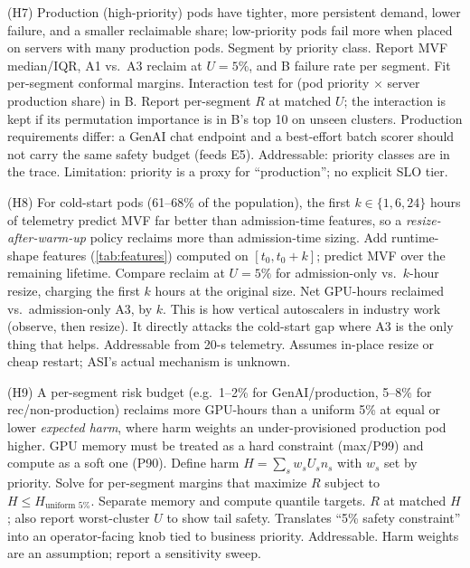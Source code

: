 {(H7) Production (high-priority) pods have tighter, more persistent demand, lower failure, and a smaller reclaimable share; low-priority pods fail more when placed on servers with many production pods.}
{Segment by priority class. Report MVF median/IQR, A1 vs.\ A3 reclaim at $U=5\%$, and B failure rate per segment. Fit per-segment conformal margins. Interaction test for (pod priority $\times$ server production share) in B.}
{Report per-segment $R$ at matched $U$; the interaction is kept if its permutation importance is in B's top 10 on unseen clusters.}
{Production requirements differ: a GenAI chat endpoint and a best-effort batch scorer should not carry the same safety budget (feeds E5).}
{Addressable: priority classes are in the trace. Limitation: priority is a proxy for ``production''; no explicit SLO tier.}

{(H8) For cold-start pods (61--68\% of the population), the first $k\in\{1,6,24\}$ hours of telemetry predict MVF far better than admission-time features, so a \emph{resize-after-warm-up} policy reclaims more than admission-time sizing.}
{Add runtime-shape features (\cref{tab:features}) computed on $[t_0, t_0+k]$; predict MVF over the remaining lifetime. Compare reclaim at $U=5\%$ for admission-only vs.\ $k$-hour resize, charging the first $k$ hours at the original size.}
{Net GPU-hours reclaimed vs.\ admission-only A3, by $k$.}
{This is how vertical autoscalers in industry work (observe, then resize). It directly attacks the cold-start gap where A3 is the only thing that helps.}
{Addressable from 20-s telemetry. Assumes in-place resize or cheap restart; ASI's actual mechanism is unknown.}

{(H9) A per-segment risk budget (e.g.\ 1--2\% for GenAI/production, 5--8\% for rec/non-production) reclaims more GPU-hours than a uniform 5\% at equal or lower \emph{expected harm}, where harm weights an under-provisioned production pod higher. GPU memory must be treated as a hard constraint (max/P99) and compute as a soft one (P90).}
{Define harm $H=\sum_s w_s U_s n_s$ with $w_s$ set by priority. Solve for per-segment margins that maximize $R$ subject to $H \le H_{\text{uniform 5\%}}$. Separate memory and compute quantile targets.}
{$R$ at matched $H$; also report worst-cluster $U$ to show tail safety.}
{Translates ``5\% safety constraint'' into an operator-facing knob tied to business priority.}
{Addressable. Harm weights are an assumption; report a sensitivity sweep.}

